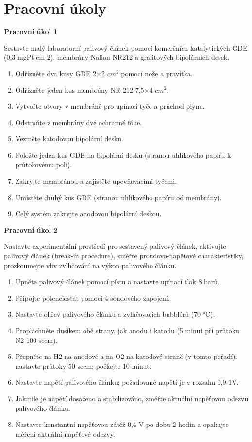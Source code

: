 \section{Pracovní úkoly}

\textbf{Pracovní úkol 1}

Sestavte malý laboratorní palivový článek pomocí komerčních katalytických GDE (0,3 mgPt cm-2), membrány Nafion NR212 a grafitových bipolárních desek.

\begin{enumerate}
\item Odřízněte dva kusy GDE 2×2 $cm^2$ pomocí nože a pravítka.
\item Odřízněte jeden kus membrány NR-212 7,5×4 $cm^2$.
\item Vytvořte otvory v membráně pro upínací tyče a průchod plynu.
\item Odstraňte z membrány dvě ochranné fólie.
\item Vezměte katodovou bipolární desku.
\item Položte jeden kus GDE na bipolární desku (stranou uhlíkového papíru k průtokovému poli).
\item Zakryjte membránou a zajistěte upevňovacími tyčemi.
\item Umístěte druhý kus GDE (stranou uhlíkového papíru od membrány).
\item Celý systém zakryjte anodovou bipolární deskou.

\end{enumerate}

\textbf{Pracovní úkol 2}

Nastavte experimentální prostředí pro sestavený palivový článek, aktivujte palivový článek (break-in procedure), změřte proudovo-napěťové charakteristiky, prozkoumejte vliv zvlhčování na výkon palivového článku.

\begin{enumerate}
\item Upněte palivový článek pomocí pístu a nastavte upínací tlak 8 barů.
\item Připojte potenciostat pomocí 4-sondového zapojení.
\item Nastavte ohřev palivového článku a zvlhčovacích bubblérů (70 °C).
\item Propláchněte dusíkem obě strany, jak anodu i katodu (5 minut při průtoku N2 100 sccm).
\item Přepněte na H2 na anodové a na O2 na katodové straně (v tomto pořadí); nastavte průtoky 50 sccm; počkejte 10 minut.
\item Nastavte napětí palivového článku; požadované napětí je v rozsahu 0,9-1V.
\item Jakmile je napětí dosaženo a stabilizováno, změřte aktuální napěťovou odezvu palivového článku.
\item Nastavte konstantní napěťovou zátěž 0,4 V po dobu 2 hodin a opakujte měření aktuální napěťové odezvy.
\end{enumerate}

